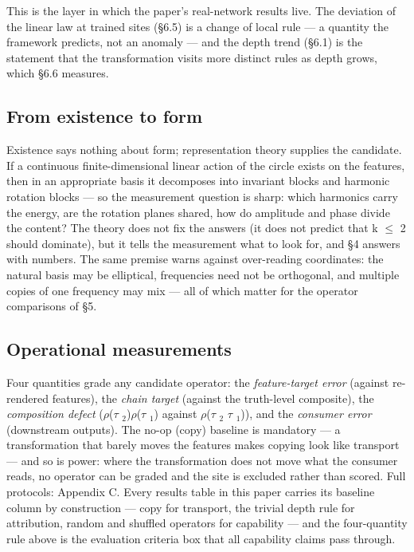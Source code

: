 This is the layer in which the paper's real-network results live. The deviation of the linear law at trained sites (\S{}6.5) is a change of local rule --- a quantity the framework predicts, not an anomaly --- and the depth trend (\S{}6.1) is the statement that the transformation visits more distinct rules as depth grows, which \S{}6.6 measures.

\subsection{From existence to form}

Existence says nothing about form; representation theory supplies the candidate. If a continuous finite-dimensional linear action of the circle exists on the features, then in an appropriate basis it decomposes into invariant blocks and harmonic rotation blocks --- so the measurement question is sharp: which harmonics carry the energy, are the rotation planes shared, how do amplitude and phase divide the content? The theory does not fix the answers (it does not predict that k $\le$ 2 should dominate), but it tells the measurement what to look for, and \S{}4 answers with numbers. The same premise warns against over-reading coordinates: the natural basis may be elliptical, frequencies need not be orthogonal, and multiple copies of one frequency may mix --- all of which matter for the operator comparisons of \S{}5.

\subsection{Operational measurements}

Four quantities grade any candidate operator: the \textit{feature-target error} (against re-rendered features), the \textit{chain target} (against the truth-level composite), the \textit{composition defect} ($\rho$($\tau$ $_2$)$\rho$($\tau$ $_1$) against $\rho$($\tau$ $_2$ $\tau$ $_1$)), and the \textit{consumer error} (downstream outputs). The no-op (copy) baseline is mandatory --- a transformation that barely moves the features makes copying look like transport --- and so is power: where the transformation does not move what the consumer reads, no operator can be graded and the site is excluded rather than scored. Full protocols: Appendix C. Every results table in this paper carries its baseline column by construction --- copy for transport, the trivial depth rule for attribution, random and shuffled operators for capability --- and the four-quantity rule above is the evaluation criteria box that all capability claims pass through.

